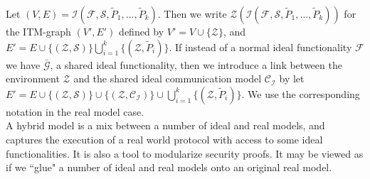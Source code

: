 \documentclass{acm_proc_article-sp}
\begin{document}
Let $(V, E) = \mathcal{I}(\mathcal{F}, \mathcal{S}, \tilde{P}_1, \ldots, \tilde{P}_k)$.
Then we write $\mathcal{Z}(\mathcal{I}(\mathcal{F}, \mathcal{S}, \tilde{P}_1, \ldots,
\tilde{P}_k))$ for the ITM-graph $(V', E')$ defined by $V' = V \cup \{\mathcal{Z}\}$,
and $E' = E \cup \{(\mathcal{Z}, \mathcal{S})\} \bigcup_{i=1}^k \{(\mathcal{Z}, \tilde{P}_i)\}$.
If instead of a normal ideal functionality $\mathcal{F}$ we have $\bar{\mathcal{G}}$, a shared
ideal functionality, then we introduce a link between the
environment $\mathcal{Z}$ and the shared ideal communication model $\mathcal{C_I}$ by let
$E' = E \cup \{(\mathcal{Z}, \mathcal{S})\} \cup \{(\mathcal{Z}, \mathcal{C_I})\}
\cup \bigcup_{i=1}^k \{(\mathcal{Z}, \tilde{P}_i)\}$. We use the corresponding notation in the
real model case.\\
A hybrid model is a mix between a number of ideal and real models, and captures the execution
of a real world protocol with access to some ideal functionalities. It is also a tool to
modularize security proofs. It may be viewed as if we ``glue" a number of ideal and real
models onto an original real model.
\end{document}

